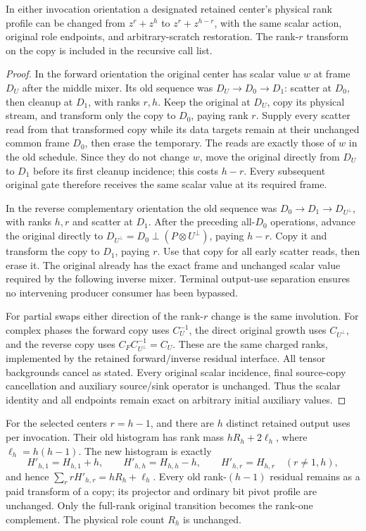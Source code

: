 \begin{lemma}
In either invocation orientation a designated retained center's
physical rank profile can be changed from $z^r+z^h$ to
$z^r+z^{h-r}$, with the same scalar action, original role endpoints,
and arbitrary-scratch restoration. The rank-$r$ transform on the copy
is included in the recursive call list.
\end{lemma}
\begin{proof}
In the forward orientation the original center has scalar value $w$
at frame $D_U$ after the middle mixer. Its old sequence was
$D_U\to D_0\to D_1$: scatter at $D_0$, then cleanup at $D_1$,
with ranks $r,h$.
Keep the original at $D_U$, copy its physical stream, and transform
only the copy to $D_0$, paying rank $r$. Supply every scatter read
from that transformed copy while its data targets remain at their
unchanged common frame $D_0$, then erase the temporary. The reads
are exactly those of $w$ in the old schedule. Since they do not change
$w$, move the original directly from $D_U$ to $D_1$ before its first
cleanup incidence; this costs $h-r$. Every subsequent original gate
therefore receives the same scalar value at its required frame.

In the reverse complementary orientation the old sequence was
$D_0\to D_1\to D_{U^\perp}$, with ranks $h,r$ and scatter at $D_1$.
After the preceding all-$D_0$ operations, advance the original directly
to $D_{U^\perp}=D_0\mathbin{\perp}(P\otimes U^\perp)$, paying
$h-r$. Copy it and transform the copy to $D_1$, paying $r$.
Use that copy for all early scatter reads, then erase it. The original
already has the exact frame and unchanged scalar value required by the
following inverse mixer. Terminal output-use separation ensures no
intervening producer consumer has been bypassed.

For partial swaps either direction of the rank-$r$ change is the same
involution. For complex phases the forward copy uses $C_U^{-1}$,
the direct original growth uses $C_{U^\perp}$, and the reverse copy
uses $C_FC_{U^\perp}^{-1}=C_U$. These are the same charged ranks,
implemented by the retained forward/inverse residual interface.
All tensor backgrounds cancel as stated. Every original scalar
incidence, final source-copy cancellation and auxiliary source/sink
operator is unchanged. Thus the scalar identity and all endpoints
remain exact on arbitrary initial auxiliary values.
\end{proof}

For the selected centers $r=h-1$, and there are $h$ distinct retained
output uses per invocation. Their old histogram has rank mass
$hR_h+2\ell_h$, where $\ell_h=h(h-1)$. The new histogram is exactly
\[
 H'_{h,1}=H_{h,1}+h,\qquad H'_{h,h}=H_{h,h}-h,
 \qquad H'_{h,r}=H_{h,r}\quad(r\ne1,h),
\]
and hence $\sum_r rH'_{h,r}=hR_h+\ell_h$.
Every old rank-$(h-1)$ residual remains as a paid transform of a copy;
its projector and ordinary bit pivot profile are unchanged. Only the
full-rank original transition becomes the rank-one complement.
The physical role count $R_h$ is unchanged.

